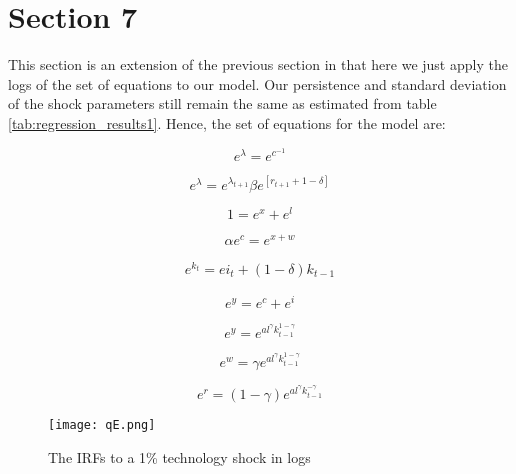 \documentclass[
  11pt,
  justified]{article}
\begin{document}
\hypertarget{section-7}{%
\section{Section 7}\label{section-7}}

This section is an extension of the previous section in that here we
just apply the logs of the set of equations to our model. Our
persistence and standard deviation of the shock parameters still remain
the same as estimated from table \ref{tab:regression_results1}. Hence,
the set of equations for the model are:

\begin{equation} 
e^{\lambda} = e^{c^{-1}}
\label{eq:mu_of_consumption1}
\end{equation}

\begin{equation}
e^{\lambda} = e^{\lambda_{t+1}} \beta e^{[r_{t+1} + 1 - \delta]}
\label{eq:intertemporal_margin1}
\end{equation}

\begin{equation}
1 = e^{x} + e^{l}
\label{eq:time_constraint1}
\end{equation}

\begin{equation}
\alpha e^{c} = e^{x + w}
\label{eq:labour_supply1}
\end{equation}

\begin{align}
e^{k_t} = e{i_t + (1 - \delta)k_{t-1}}
\label{eq:cap_accum1}
\end{align}

\begin{equation}
e^{y} = e^{c} + e^{i}
\label{eq:market clearing1}
\end{equation}

\begin{equation}
e^{y} = e^{a l^{\gamma} k_{t-1}^{1 - \gamma}}  
\label{eq:production_function1}
\end{equation}

\begin{equation}
e^{w} = \gamma e^{a l^{\gamma} k_{t-1}^{1 - \gamma}}
\label{eq:wage1}
\end{equation}

\begin{equation}
e^{r} = (1 - \gamma)   e^{a l^{\gamma} k_{t-1}^{- \gamma}}
\label{eq:capital_return1}
\end{equation}

\begin{figure}
    \texttt{[image: qE.png]}
    \caption{The IRFs to a 1\% technology shock in logs}
    \label{fig22}
\end{figure}
\end{document}
